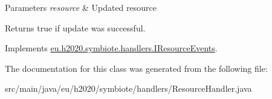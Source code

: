 \begin{DoxyParams}{Parameters}
{\em resource} & Updated resource \\
\hline
\end{DoxyParams}
\begin{DoxyReturn}{Returns}
{\ttfamily true} if update was successful. 
\end{DoxyReturn}


Implements \hyperlink{interfaceeu_1_1h2020_1_1symbiote_1_1handlers_1_1IResourceEvents_aaac836b0134ed41ad529b9ac3124a216}{eu.\+h2020.\+symbiote.\+handlers.\+I\+Resource\+Events}.



The documentation for this class was generated from the following file\+:\begin{DoxyCompactItemize}
\item 
src/main/java/eu/h2020/symbiote/handlers/Resource\+Handler.\+java\end{DoxyCompactItemize}
